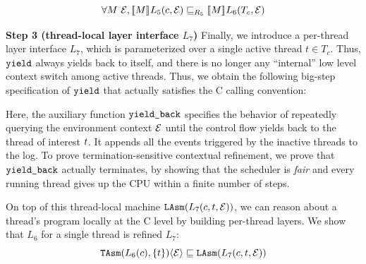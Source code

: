 {{\begin{lemma}
{\small
\[
\forall M~ \oracle, 
\sem{ }{M}L_5(c,\oracle) \Refrel_{R_5} 
\sem{}{M}L_6(T_c, \oracle)
\]}
\label{whole_thread_composition}
\end{lemma}}


\noindent\textbf{Step 3 (thread-local layer interface $L_7$)} 
Finally, we introduce a per-thread layer interface $L_7$, which is parameterized
over a single active thread $t\in T_c$.
Thus, $\yield$ always yields back to itself,
and there is no longer any ``internal'' low level context switch among active threads.
Thus, we obtain the following big-step specification of $\yield$ that actually
satisfies the C calling convention:
\begin{small}
\begin{mathpar}
\end{mathpar}
\end{small}%
Here, the auxiliary function $\comm{yield\_back}$ 
specifies the behavior of repeatedly querying the environment context
$\oracle$ until the control flow yields back to the thread of interest $\tid$.
It appends all the events triggered by the inactive threads to the log.
To prove termination-sensitive contextual refinement,
we prove that $\comm{yield\_back}$ actually terminates,
by showing that the scheduler is \emph{fair} and every running
thread gives up the CPU within a finite number of steps.

On top of this thread-local machine $\LAsm(L_7(c, t, \oracle))$,
we can reason about a thread's program 
locally at the C level by building per-thread layers.
We show that $L_6$ for a single thread is refined $L_7$:
{\small
\[ \TAsm(L_6(c), \{t\})\langle \oracle \rangle \Refrel \LAsm(L_7(c, t, \oracle)) \]
}%

}
